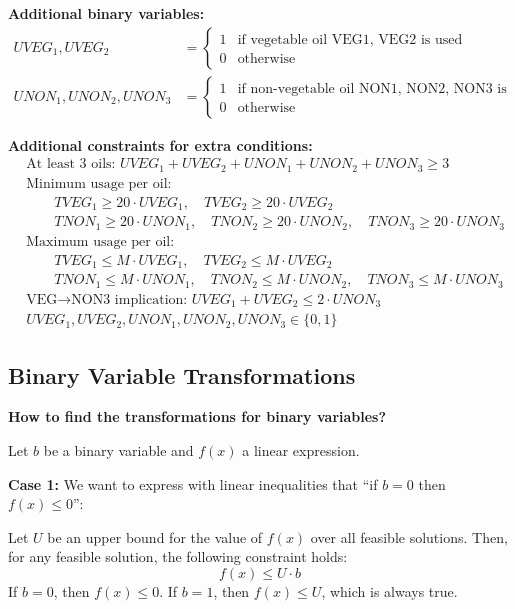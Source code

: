 \documentclass[a4paper,10pt]{article}
\begin{document}
\textbf{Additional binary variables:}
\begin{align}
UVEG_1, UVEG_2 &= \begin{cases} 
1 & \text{if vegetable oil VEG1, VEG2 is used} \\
0 & \text{otherwise}
\end{cases}\\
UNON_1, UNON_2, UNON_3 &= \begin{cases} 
1 & \text{if non-vegetable oil NON1, NON2, NON3 is used} \\
0 & \text{otherwise}
\end{cases}
\end{align}

\textbf{Additional constraints for extra conditions:}
\begin{align}
&\text{At least 3 oils: } UVEG_1 + UVEG_2 + UNON_1 + UNON_2 + UNON_3 \geq 3\\
&\text{Minimum usage per oil: }\\
&\qquad TVEG_1 \geq 20 \cdot UVEG_1, \quad TVEG_2 \geq 20 \cdot UVEG_2\\
&\qquad TNON_1 \geq 20 \cdot UNON_1, \quad TNON_2 \geq 20 \cdot UNON_2, \quad TNON_3 \geq 20 \cdot UNON_3\\
&\text{Maximum usage per oil: }\\
&\qquad TVEG_1 \leq M \cdot UVEG_1, \quad TVEG_2 \leq M \cdot UVEG_2\\
&\qquad TNON_1 \leq M \cdot UNON_1, \quad TNON_2 \leq M \cdot UNON_2, \quad TNON_3 \leq M \cdot UNON_3\\
&\text{VEG→NON3 implication: } UVEG_1 + UVEG_2 \leq 2 \cdot UNON_3\\
&UVEG_1, UVEG_2, UNON_1, UNON_2, UNON_3 \in \{0,1\}
\end{align}



\subsection*{Binary Variable Transformations}

\textbf{How to find the transformations for binary variables?}

Let $b$ be a binary variable and $f(x)$ a linear expression.

\textbf{Case 1:} We want to express with linear inequalities that ``if $b=0$ then $f(x) \leq 0$'':

Let $U$ be an upper bound for the value of $f(x)$ over all feasible solutions. 
Then, for any feasible solution, the following constraint holds:
\[f(x) \leq U \cdot b\]
If $b=0$, then $f(x) \leq 0$. If $b=1$, then $f(x) \leq U$, which is always true.
\end{document}

